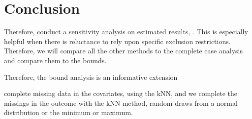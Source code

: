 
\section{Conclusion}
\label{sec:conlcusion}

Therefore, conduct a sensitivity analysis on estimated results, . This is especially helpful when there is reluctance to rely upon speciﬁc exclusion restrictions. Therefore, we will compare all the other methods to the complete case analysis and compare them to the bounds.

Therefore, the bound analysis is an informative extension



 complete missing data in the covariates, using the \ac{kNN}, and we complete the missings in the outcome with the \ac{kNN} method, random draws from a normal distribution or the minimum or maximum.


